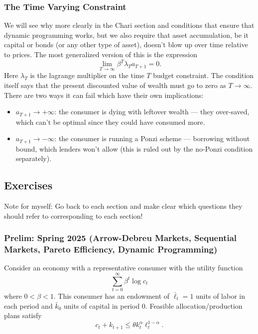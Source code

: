 \documentclass[11pt,english]{article}
\begin{document}
\subsubsection{The Time Varying Constraint}

We will see why more clearly in the Chari section and conditions that ensure that dynamic programming works, but we also require that asset accumulation, be it capital or bonds (or any other type of asset), doesn't blow up over time relative to prices. The most generalized version of this is the expression $$\lim_{T\to \infty}\beta^T \lambda_Ta_{T+1} = 0.$$ Here $\lambda_T$ is the lagrange multiplier on the time $T$ budget constraint. The condition itself says that the present discounted value of wealth must go to zero as $T \to \infty$. There are two ways it can fail which have their own implications:
\begin{itemize}
\item $a_{T+1}\to +\infty$: the consumer is dying with leftover wealth — they over-saved, which can't be optimal since they could have consumed more.

\item $a_{T+1}\to -\infty$: the consumer is running a Ponzi scheme — borrowing without bound, which lenders won't allow (this is ruled out by the no-Ponzi condition separately).
\end{itemize}

\subsection{Exercises}
Note for myself: Go back to each section and make clear which questions they should refer to corresponding to each section!

\subsubsection{Prelim: Spring 2025 (Arrow-Debreu Markets, Sequential Markets, Pareto Efficiency, Dynamic Programming)}
Consider an economy with a representative consumer with the utility function
\[
\sum_{t=0}^{\infty} \beta^t \log c_t
\]
where $0 < \beta < 1$. This consumer has an endowment of $\bar{\ell}_t = 1$ units of labor in each period and $\bar{k}_0$ units of capital in period 0. Feasible allocation/production plans satisfy
$$
c_t + k_{t+1} \leq \theta k_t^{\alpha} \ell_t^{1-\alpha}.
$$
\end{document}
